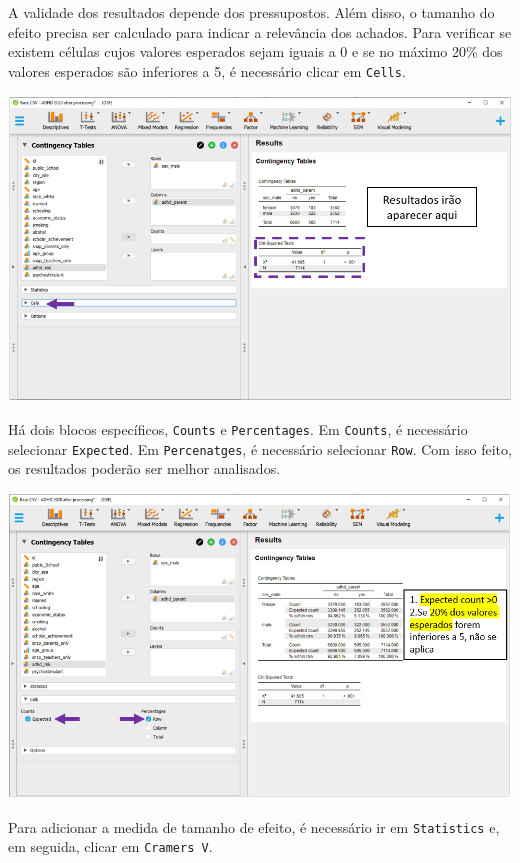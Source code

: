 \documentclass[
]{book}
\begin{document}
A validade dos resultados depende dos pressupostos. Além disso, o tamanho do efeito precisa ser calculado para indicar a relevância dos achados. Para verificar se existem células cujos valores esperados sejam iguais a 0 e se no máximo 20\% dos valores esperados são inferiores a 5, é necessário clicar em \texttt{Cells}.

\includegraphics{./img/cap_x2_pressupostos.png}

Há dois blocos específicos, \texttt{Counts} e \texttt{Percentages}. Em \texttt{Counts}, é necessário selecionar \texttt{Expected}. Em \texttt{Percenatges}, é necessário selecionar \texttt{Row}. Com isso feito, os resultados poderão ser melhor analisados.

\includegraphics{./img/cap_x2_pressupostos2.png}

Para adicionar a medida de tamanho de efeito, é necessário ir em \texttt{Statistics} e, em seguida, clicar em \texttt{Cramer\textquotesingle{}s\ V}.
\end{document}
